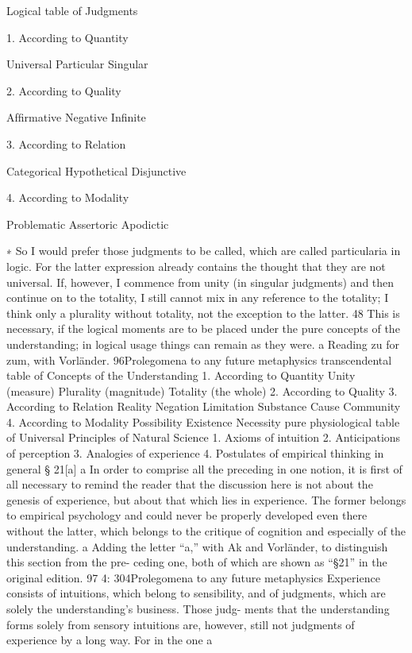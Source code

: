Logical table of Judgments

1. According to Quantity

Universal
Particular
Singular

2. According to Quality

Afﬁrmative
Negative
Infinite

3. According to Relation

Categorical
Hypothetical
Disjunctive

4. According to Modality

Problematic
Assertoric
Apodictic

∗ So I would prefer those judgments to be called, which are called particularia in
logic. For the latter expression already contains the thought that they are not
universal. If, however, I commence from unity (in singular judgments) and then
continue on to the totality, I still cannot mix in any reference to the totality; I
think only a plurality without totality, not the exception to the latter. 48 This is
necessary, if the logical moments are to be placed under the pure concepts of
the understanding; in logical usage things can remain as they were.
a Reading zu for zum, with Vorländer.
96Prolegomena to any future metaphysics
transcendental table
of Concepts of the Understanding
1.
According to Quantity
Unity (measure)
Plurality (magnitude)
Totality (the whole)
2.
According to Quality 3.
According to Relation
Reality
Negation
Limitation Substance
Cause
Community
4.
According to Modality
Possibility
Existence
Necessity
pure physiological table
of Universal Principles of Natural Science
1.
Axioms
of intuition
2.
Anticipations
of perception
3.
Analogies
of experience
4.
Postulates
of empirical thinking in general
§ 21[a] a
In order to comprise all the preceding in one notion, it is ﬁrst of all
necessary to remind the reader that the discussion here is not about
the genesis of experience, but about that which lies in experience. The
former belongs to empirical psychology and could never be properly
developed even there without the latter, which belongs to the critique of
cognition and especially of the understanding.
a
Adding the letter “a,” with Ak and Vorländer, to distinguish this section from the pre-
ceding one, both of which are shown as “§21” in the original edition.
97
4: 304Prolegomena to any future metaphysics
Experience consists of intuitions, which belong to sensibility, and of
judgments, which are solely the understanding’s business. Those judg-
ments that the understanding forms solely from sensory intuitions are,
however, still not judgments of experience by a long way. For in the one a
